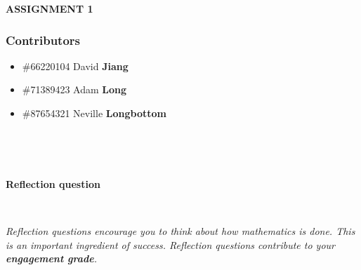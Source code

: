 \documentclass{exam}
\begin{document}
\large{\textbf{ASSIGNMENT 1}}

\normalsize




\subsubsection*{Contributors}


\begin{itemize}
    \item \#66220104 David {\bf Jiang} 
    \item \#71389423 Adam {\bf Long}
    \item \#87654321 Neville {\bf Longbottom}
\end{itemize}

\

\hrulefill

\

\textbf{Reflection question}

\

\textit{Reflection questions encourage you to think about how mathematics is done. This is an important ingredient of success. Reflection questions contribute to your \textbf{engagement grade}.}
\end{document}
